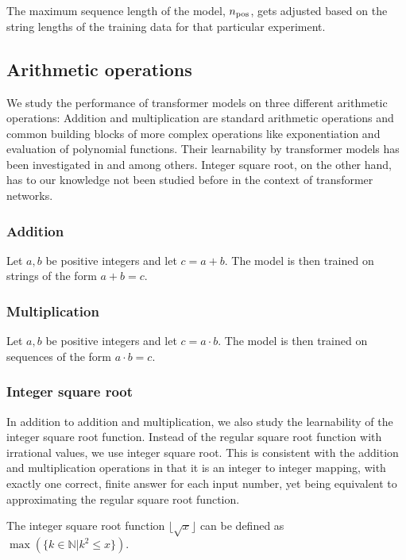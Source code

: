 The maximum sequence length of the model, ${n_\textrm{pos}}$, gets adjusted based on the string lengths of the training data for that particular experiment.


\subsection{Arithmetic operations}
\label{methods:ops}

We study the performance of transformer models on three different arithmetic operations: Addition and multiplication are standard arithmetic operations and common building blocks of more complex operations like exponentiation and evaluation of polynomial functions. Their learnability by transformer models has been investigated in \cite{teaching} and \cite{visual} among others. Integer square root, on the other hand, has to our knowledge not been studied before in the context of transformer networks.

\subsubsection{Addition}
\label{methods:ops:add}

Let $a, b$ be positive integers and let $c=a+b$. The model is then trained on strings of the form $a+b=c$.


\subsubsection{Multiplication}
\label{methods:ops:mul}

Let $a, b$ be positive integers and let $c=a \cdot b$. The model is then trained on sequences of the form $a \cdot b=c$.

\subsubsection{Integer square root}
\label{methods:ops:isqrt}

In addition to addition and multiplication, we also study the learnability of the integer square root function. Instead of the regular square root function with irrational values, we use integer square root. This is consistent with the addition and multiplication operations in that it is an integer to integer mapping, with exactly one correct, finite answer for each input number, yet being equivalent to approximating the regular square root function.

The integer square root function $\lfloor \sqrt{x} \rfloor$ can be defined as $\max(\{ k \in \mathbb{N} | k^2 \leq x \})$.

